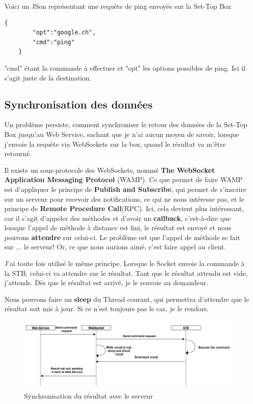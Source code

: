 Voici un JSon représentant une requête de ping envoyée sur la Set-Top Box
\begin{lstlisting}[caption={Résultat au format JSon}]
	{
		"opt":"google.ch",
		"cmd":"ping"
	}
\end{lstlisting}

"cmd" étant la commande à effectuer et "opt" les options possibles de ping. Ici il s'agit juste de la destination.
\subsection{Synchronisation des données}
Un problème persiste, comment synchroniser le retour des données de la Set-Top Box jusqu'au Web Service, sachant que je n'ai aucun moyen de savoir, lorsque j'envoie la requête via WebSockets sur la box, quand le résultat va m'être retourné.

\medskip

Il existe un sous-protocole des WebSockets, nommé \textbf{The WebSocket Application Messaging Protocol} (WAMP). Ce que permet de faire WAMP est d'appliquer le principe de \textbf{Publish and Subscribe}, qui permet de s'inscrire sur un serveur pour recevoir des notifications, ce qui ne nous intéresse pas, et le principe de \textbf{Remote Procedure Call}(RPC). Ici, cela devient plus intéressant, car il s'agit d'appeler des méthodes et d'avoir un \textbf{callback}, c'est-à-dire que lorsque l'appel de méthode à distance est fini, le résultat est envoyé et nous pouvons \textbf{attendre} sur celui-ci. Le problème est que l'appel de méthode se fait sur ... le serveur! Or, ce que nous aurions aimé, c'est faire appel au client.

\medskip

J'ai toute fois utilisé le même principe. Lorsque le Socket envoie la commande à la STB, celui-ci va attendre sur le résultat. Tant que le résultat attendu est vide, j'attends. Dès que le résultat est arrivé, je le renvoie au demandeur.

Nous pouvons faire un \textbf{sleep} du Thread courant, qui permettra d'attendre que le résultat soit mis à jour. Si ce n'est toujours pas le cas, je le rendors.


\begin{figure}[H]
      \centering
      \includegraphics[width=\textwidth]{00_media/sync_data}
      \caption{Synchronisation du résultat avec le serveur}
      \label{gra:maqmenu}
\end{figure}

